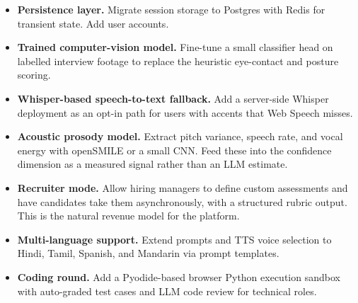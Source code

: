 \documentclass[11pt,a4paper]{article}
\begin{document}
\begin{itemize}
  \item \textbf{Persistence layer.} Migrate session storage to Postgres
        with Redis for transient state. Add user accounts.
  \item \textbf{Trained computer-vision model.} Fine-tune a small
        classifier head on labelled interview footage to replace the
        heuristic eye-contact and posture scoring.
  \item \textbf{Whisper-based speech-to-text fallback.} Add a server-side
        Whisper deployment as an opt-in path for users with accents that
        Web Speech misses.
  \item \textbf{Acoustic prosody model.} Extract pitch variance, speech
        rate, and vocal energy with openSMILE or a small CNN. Feed these
        into the confidence dimension as a measured signal rather than an
        LLM estimate.
  \item \textbf{Recruiter mode.} Allow hiring managers to define custom
        assessments and have candidates take them asynchronously, with a
        structured rubric output. This is the natural revenue model for
        the platform.
  \item \textbf{Multi-language support.} Extend prompts and TTS voice
        selection to Hindi, Tamil, Spanish, and Mandarin via prompt
        templates.
  \item \textbf{Coding round.} Add a Pyodide-based browser Python execution
        sandbox with auto-graded test cases and LLM code review for
        technical roles.
\end{itemize}
\end{document}
